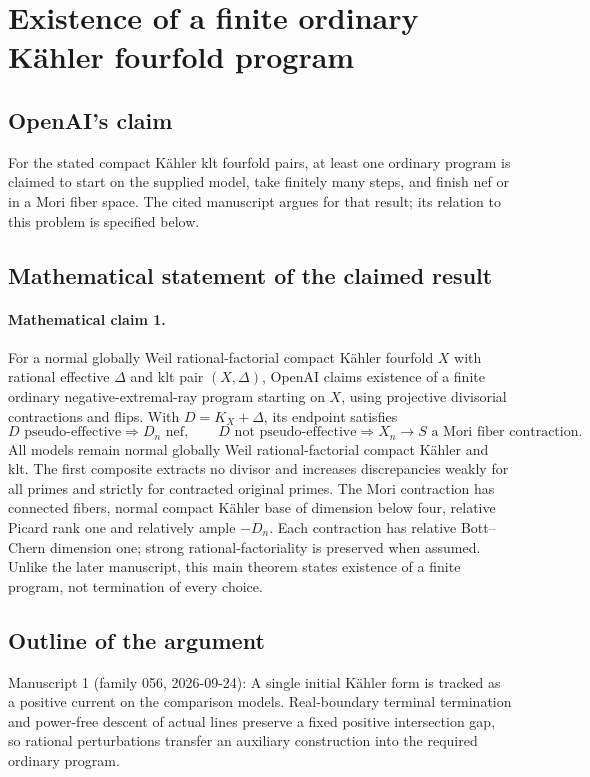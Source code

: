 \documentclass[11pt]{article}
\begin{document}
\section*{Existence of a finite ordinary Kähler fourfold program}

\subsection{OpenAI's claim}
For the stated compact Kähler klt fourfold pairs, at least one ordinary program is claimed to start on the supplied model, take finitely many steps, and finish nef or in a Mori fiber space. The cited manuscript argues for that result; its relation to this problem is specified below.

\subsection{Mathematical statement of the claimed result}
\paragraph{Mathematical claim 1.} For a normal globally Weil rational-factorial compact Kähler fourfold $X$ with rational effective $\Delta$ and klt pair $(X,\Delta)$, OpenAI claims existence of a finite ordinary negative-extremal-ray program starting on $X$, using projective divisorial contractions and flips. With $D=K_X+\Delta$, its endpoint satisfies
\[
D\text{ pseudo-effective}\Rightarrow D_n\text{ nef},\qquad
D\text{ not pseudo-effective}\Rightarrow X_n\to S\text{ a Mori fiber contraction}.
\]
All models remain normal globally Weil rational-factorial compact Kähler and klt. The first composite extracts no divisor and increases discrepancies weakly for all primes and strictly for contracted original primes. The Mori contraction has connected fibers, normal compact Kähler base of dimension below four, relative Picard rank one and relatively ample $-D_n$. Each contraction has relative Bott--Chern dimension one; strong rational-factoriality is preserved when assumed. Unlike the later manuscript, this main theorem states existence of a finite program, not termination of every choice.

\subsection{Outline of the argument}
Manuscript 1 (family 056, 2026-09-24): A single initial Kähler form is tracked as a positive current on the comparison models. Real-boundary terminal termination and power-free descent of actual lines preserve a fixed positive intersection gap, so rational perturbations transfer an auxiliary construction into the required ordinary program.
\end{document}

